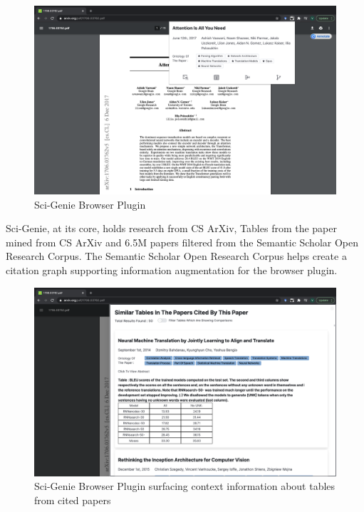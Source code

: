 \begin{figure}[h]
    \centering
    \includegraphics[width=\maxwidth{\textwidth}]{src/images/sci-genie-ext-exp.png}
    \caption{ Sci-Genie Browser Plugin}
    \label{figure\arabic{figurecounter}}
\end{figure}

Sci-Genie, at its core, holds research from CS ArXiv, Tables from the paper mined from CS ArXiv and 
6.5M papers filtered from the Semantic Scholar Open Research Corpus\parencite{ammar-etal-2018-construction}.
The Semantic Scholar Open Research Corpus helps create a citation graph supporting information augmentation for the browser plugin. 

\begin{figure}[h]
    \centering
    \includegraphics[width=\maxwidth{\textwidth}]{src/images/sci-genie-ext-table-exp.png}
    \caption{Sci-Genie Browser Plugin surfacing context information about tables from cited papers }
    \label{figure\arabic{figurecounter}}
\end{figure}


